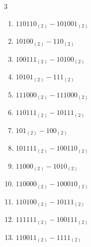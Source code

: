 \begin{multicols}{3}
\begin{enumerate}
  \item $110110_{(2)} - 101001_{(2)}$


  \item $10100_{(2)} - 110_{(2)}$


  \item $100111_{(2)} - 10100_{(2)}$


\columnbreak %

  \item $10101_{(2)} - 111_{(2)}$


  \item $111000_{(2)} - 111000_{(2)}$


  \item $110111_{(2)} - 10111_{(2)}$


  \item $101_{(2)} - 100_{(2)}$


  \item $101111_{(2)} - 100110_{(2)}$


  \item $11000_{(2)} - 1010_{(2)}$


  \item $110000_{(2)} - 100010_{(2)}$


  \item $110100_{(2)} - 10111_{(2)}$


  \item $111111_{(2)} - 100111_{(2)}$


  \item $110011_{(2)} - 1111_{(2)}$


\end{enumerate}
\end{multicols}

